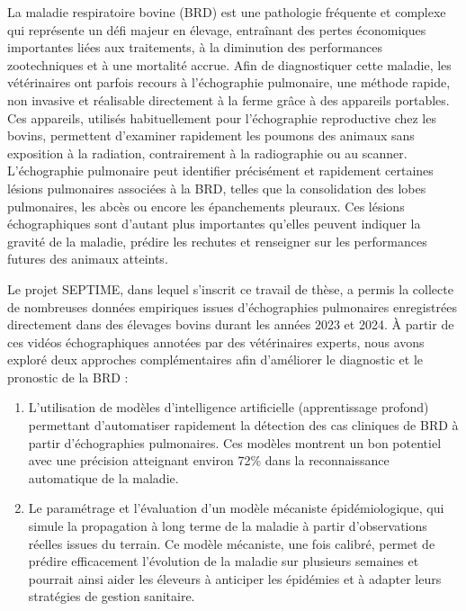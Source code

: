 La maladie respiratoire bovine (BRD) est une pathologie fréquente et complexe qui représente un défi majeur en élevage, entraînant des pertes économiques importantes liées aux traitements, à la diminution des performances zootechniques et à une mortalité accrue. Afin de diagnostiquer cette maladie, les vétérinaires ont parfois recours à l’échographie pulmonaire, une méthode rapide, non invasive et réalisable directement à la ferme grâce à des appareils portables. Ces appareils, utilisés habituellement pour l'échographie reproductive chez les bovins, permettent d’examiner rapidement les poumons des animaux sans exposition à la radiation, contrairement à la radiographie ou au scanner. L’échographie pulmonaire peut identifier précisément et rapidement certaines lésions pulmonaires associées à la BRD, telles que la consolidation des lobes pulmonaires, les abcès ou encore les épanchements pleuraux. Ces lésions échographiques sont d’autant plus importantes qu’elles peuvent indiquer la gravité de la maladie, prédire les rechutes et renseigner sur les performances futures des animaux atteints.

Le projet SEPTIME, dans lequel s’inscrit ce travail de thèse, a permis la collecte de nombreuses données empiriques issues d’échographies pulmonaires enregistrées directement dans des élevages bovins durant les années 2023 et 2024. À partir de ces vidéos échographiques annotées par des vétérinaires experts, nous avons exploré deux approches complémentaires afin d’améliorer le diagnostic et le pronostic de la BRD :


\begin{enumerate} 
    \item L’utilisation de modèles d’intelligence artificielle (apprentissage profond) permettant d’automatiser rapidement la détection des cas cliniques de BRD à partir d’échographies pulmonaires. Ces modèles montrent un bon potentiel avec une précision atteignant environ 72\% dans la reconnaissance automatique de la maladie.

    \item Le paramétrage et l’évaluation d’un modèle mécaniste épidémiologique, qui simule la propagation à long terme de la maladie à partir d'observations réelles issues du terrain. Ce modèle mécaniste, une fois calibré, permet de prédire efficacement l’évolution de la maladie sur plusieurs semaines et pourrait ainsi aider les éleveurs à anticiper les épidémies et à adapter leurs stratégies de gestion sanitaire.

\end{enumerate}


